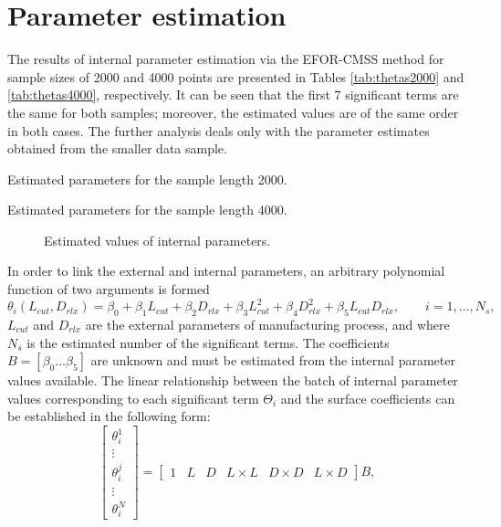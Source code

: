 \documentclass[a4paper,11pt,twoside]{article}
\theoremstyle{mytheoremstyle}
\begin{document}
\section{Parameter estimation}
\par The results of internal parameter estimation via the EFOR-CMSS method for sample sizes of 2000 and 4000 points are presented in Tables \ref{tab:thetas2000} and \ref{tab:thetas4000}, respectively. It can be seen that the first 7 significant terms are the same for both samples; moreover, the estimated values are of the same order in both cases. The further analysis deals only with the parameter estimates obtained from the smaller data sample. 
\begin{table}[!h]
	\centering
	\caption{Estimated parameters for the sample length 2000.}\label{tab:thetas2000}
	\small
	
\end{table}
\begin{table}[!h]
	\centering
	\caption{Estimated parameters for the sample length 4000.}\label{tab:thetas4000}
	\small
	
\end{table}
\begin{figure}[!h]
	\centering
	
	\caption{Estimated values of internal parameters.}
\end{figure}
\par In order to link the external and internal parameters, an arbitrary polynomial function of two arguments is formed
\begin{equation}
\theta_i(L_{cut},D_{rlx}) = \beta_0 + \beta_1 L_{cut} + \beta_2 D_{rlx} + \beta_3 L_{cut}^{2} + \beta_4 D_{rlx}^{2} + \beta_5 L_{cut} D_{rlx}, \qquad i=1,\dots,N_s,
\end{equation}
$L_{cut}$ and $D_{rlx}$ are the external parameters of manufacturing process, and where $N_s$ is the estimated number of the significant terms. The coefficients $B = \left[ \beta_0 \dots \beta_5 \right]$ are unknown and must be estimated from the internal parameter values available. The linear relationship between the batch of internal parameter values corresponding to each significant term $\Theta_i$ and the surface coefficients can be established in the following form:
\begin{equation}\label{eq:linrel}
\left[\begin{array}{c}
\theta_{i}^{1} \\
\vdots \\
\theta_{i}^{j} \\
\vdots \\
\theta_{i}^{N}
\end{array}\right] =
\left[\begin{array}{cccccc}
1 & L& D& L\times L& D\times D& L\times D
\end{array}\right] B,
\end{equation}
\end{document}
